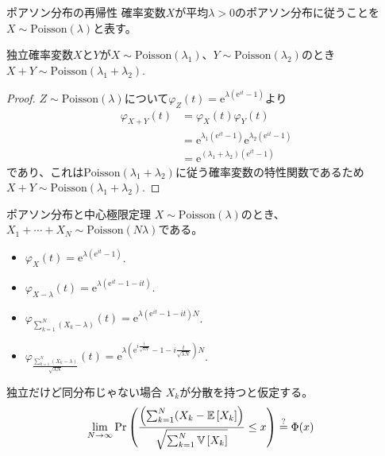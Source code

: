 \documentclass[lualatex,handout]{beamer}
\newcommand{\expt}[1]{\mathbb{E}\left[#1\right]}
\newcommand{\var}[1]{\mathbb{V}\left[#1\right]}
\theoremstyle{definition}
\begin{document}
\begin{frame}{ポアソン分布の再帰性}
確率変数$X$が平均$\lambda>0$のポアソン分布に従うことを$X\sim\mathrm{Poisson}(\lambda)$と表す。
\begin{lemma}
独立確率変数$X$と$Y$が$X\sim\mathrm{Poisson}(\lambda_1)$、$Y\sim\mathrm{Poisson}(\lambda_2)$のとき
$X+Y\sim\mathrm{Poisson}(\lambda_1+\lambda_2)$.
\end{lemma}
\begin{proof}
$Z\sim\mathrm{Poisson}(\lambda)$について$\varphi_Z(t)=\mathrm{e}^{\lambda(\mathrm{e}^{it}-1)}$より
\begin{align*}
\varphi_{X+Y}(t) &= \varphi_X(t)\varphi_Y(t)\\
&=\mathrm{e}^{\lambda_1(\mathrm{e}^{it}-1)}\mathrm{e}^{\lambda_2(\mathrm{e}^{it}-1)}\\
&=\mathrm{e}^{(\lambda_1+\lambda_2)(\mathrm{e}^{it}-1)}
\end{align*}
であり、これは$\mathrm{Poisson}(\lambda_1+\lambda_2)$に従う確率変数の特性関数であるため$X+Y\sim\mathrm{Poisson}(\lambda_1+\lambda_2)$.
\end{proof}
\end{frame}

\begin{frame}{ポアソン分布と中心極限定理}
$X\sim\mathrm{Poisson}(\lambda)$のとき、
$X_1+\dotsb+X_N\sim\mathrm{Poisson}(N\lambda)$である。
\begin{itemize}
\item $\varphi_X(t) = \mathrm{e}^{\lambda(\mathrm{e}^{it}-1)}$.
\item $\varphi_{X-\lambda}(t) = \mathrm{e}^{\lambda(\mathrm{e}^{it}-1-it)}$.
\item $\varphi_{\sum_{k=1}^N(X_k-\lambda)}(t) = \mathrm{e}^{\lambda(\mathrm{e}^{it}-1-it)N}$.
\item $\varphi_{\frac{\sum_{k=1}^N(X_k-\lambda)}{\sqrt{\lambda N}}}(t) = \mathrm{e}^{\lambda\left(\mathrm{e}^{i\frac{t}{\sqrt{\lambda N}}}-1-i\frac{t}{\sqrt{\lambda N}}\right)N}$.
\end{itemize}
\end{frame}

\begin{frame}{独立だけど同分布じゃない場合}
$X_k$が分散を持つと仮定する。
\begin{align*}
\lim_{N\to\infty}\Pr\left(\frac{\left(\sum_{k=1}^N (X_k-\expt{X_k}\right)}{\sqrt{\sum_{k=1}^N\var{X_k}}} \le x\right) &\stackrel{\large ?}{=} \Phi(x)
\end{align*}
\end{frame}
\fi
\end{document}
